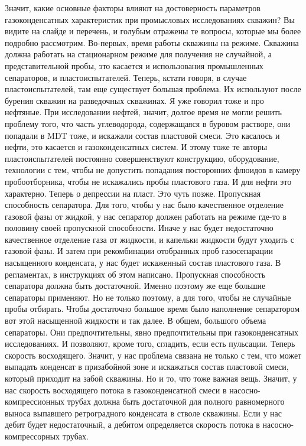 \documentclass[main.tex]{subfiles}
\begin{document}
Значит, какие основные факторы влияют на достоверность параметров газоконденсатных характеристик при промысловых исследованиях скважин?
Вы видите на слайде и перечень, и голубым отражены те вопросы, которые мы более подробно рассмотрим.
Во-первых, время работы скважины на режиме.
Скважина должна работать на стационарном режиме для получения не случайной, а представительной пробы, это касается и использования промышленных сепараторов, и пластоиспытателей.
Теперь, кстати говоря, в случае пластоиспытателей, там еще существует большая проблема.
Их используют после бурения скважин на разведочных скважинах.
Я уже говорил тоже и про нефтяные.
При исследовании нефтей, значит, долгое время не могли решить проблему того, что часть углеводорода, содержащаяся в буровом растворе, они попадали в MDT тоже, и искажали состав пластовой смеси.
Это касалось и нефти, это касается и газоконденсатных систем.
И этому тоже те авторы пластоиспытателей постоянно совершенствуют конструкцию, оборудование, технологии с тем, чтобы не допустить попадания посторонних флюидов в камеру пробоотборника, чтобы не искажались пробы пластового газа.
И для нефти это характерно.
Теперь о депрессии на пласт.
Это чуть позже.
Пропускная способность сепаратора.
Для того, чтобы у нас было качественное отделение газовой фазы от жидкой, у нас сепаратор должен работать на режиме где-то в половину своей пропускной способности.
Иначе у нас будет недостаточно качественное отделение газа от жидкости, и капельки жидкости будут уходить с газовой фазы.
И затем при рекомбинации отобранных проб газосепарации насыщенного конденсата, у нас будет искаженный состав пластового газа.
В регламентах, в инструкциях об этом написано.
Пропускная способность сепаратора должна быть достаточной.
Именно поэтому же еще большие сепараторы применяют.
Но не только поэтому, а для того, чтобы не случайные пробы отбирать.
Чтобы достаточно большое время было наполнение сепаратором вот этой насыщенной жидкости и так далее.
В общем, большого объема сепараторы.
Они предпочтительны, явно предпочтительны при газоконденсатных исследованиях.
И позволяют, кроме того, сгладить, если есть пульсации.
Теперь скорость восходящего.
Значит, у нас проблема связана не только с тем, что может выпадать конденсат в призабойной зоне и искажаться состав пластовой смеси, который приходит на забой скважины.
Но и то, что тоже важная вещь.
Значит, у нас скорость восходящего потока в газоконденсатной смеси в насосно-компрессионных трубах должна быть достаточной для полного равномерного выноса выпавшего ретроградного конденсата в стволе скважины.
Если у нас дебит будет недостаточный, а дебитом определяется скорость потока в насосно-компрессорных трубах.
\end{document}
